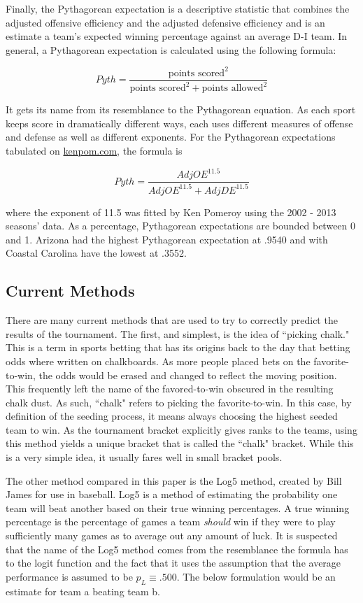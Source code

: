 \documentclass[5p, preprint]{elsarticle}
\begin{document}
Finally, the Pythagorean expectation is a descriptive statistic that combines the adjusted offensive efficiency and the adjusted defensive efficiency and is an estimate a team's expected winning percentage against an average D-I team. In general, a Pythagorean expectation is calculated using the following formula:

\[
Pyth = \frac{\mbox{points scored} ^ 2}{\mbox{points scored} ^ 2 + \mbox{points allowed} ^ 2}
\]

It gets its name from its resemblance to the Pythagorean equation. As each sport keeps score in dramatically different ways, each uses different measures of offense and defense as well as different exponents. For the Pythagorean expectations tabulated on \url{kenpom.com}, the formula is

\[
Pyth = \frac{AdjOE^{11.5}}{AdjOE^{11.5} + AdjDE^{11.5}}
\]

where the exponent of 11.5 was fitted by Ken Pomeroy using the 2002 - 2013 seasons' data. As a percentage, Pythagorean expectations are bounded between 0 and 1. Arizona had the highest Pythagorean expectation at .9540 and with Coastal Carolina have the lowest at .3552.


\subsection{Current Methods}

There are many current methods that are used to try to correctly predict the results of the tournament. The first, and simplest, is the idea of ``picking chalk." This is a term in sports betting that has its origins back to the day that betting odds where written on chalkboards. As more people placed bets on the favorite-to-win, the odds would be erased and changed to  reflect the moving position. This frequently left the name of the favored-to-win obscured in the resulting chalk dust. As such, ``chalk" refers to picking the favorite-to-win. In this case, by definition of the seeding process,  it means always choosing the highest seeded team to win.  As the tournament bracket explicitly gives ranks to the teams, using this method yields a unique bracket that is called the ``chalk" bracket. While this is a very simple idea, it usually fares well in small bracket pools. 

The other method compared in this paper is the Log5 method, created by Bill James for use in baseball.  Log5 is a method of estimating the probability one team will beat another based on their true winning percentages. A true winning percentage is the percentage of games a team \emph{should} win if they were to play sufficiently many games as to average out any amount of luck. It is suspected that the name of the Log5 method comes from the resemblance  the formula has to the logit function and the fact that it uses the assumption that the average performance is assumed to be $p_L \equiv .500$. The below formulation would be an estimate for team a beating team b.
\end{document}
